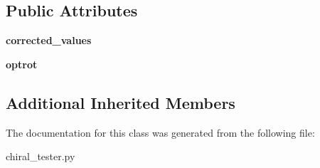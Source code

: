 \subsection*{Public Attributes}
\begin{DoxyCompactItemize}
\item 
\hypertarget{classchiral__tester_1_1optical__rotation__test_a9309df9124146940a88535e5c5d29d48}{{\bfseries corrected\+\_\+values}}\label{classchiral__tester_1_1optical__rotation__test_a9309df9124146940a88535e5c5d29d48}

\item 
\hypertarget{classchiral__tester_1_1optical__rotation__test_a92458035f0e9d56eda4a80820b32324b}{{\bfseries optrot}}\label{classchiral__tester_1_1optical__rotation__test_a92458035f0e9d56eda4a80820b32324b}

\end{DoxyCompactItemize}
\subsection*{Additional Inherited Members}


The documentation for this class was generated from the following file\+:\begin{DoxyCompactItemize}
\item 
chiral\+\_\+tester.\+py\end{DoxyCompactItemize}
